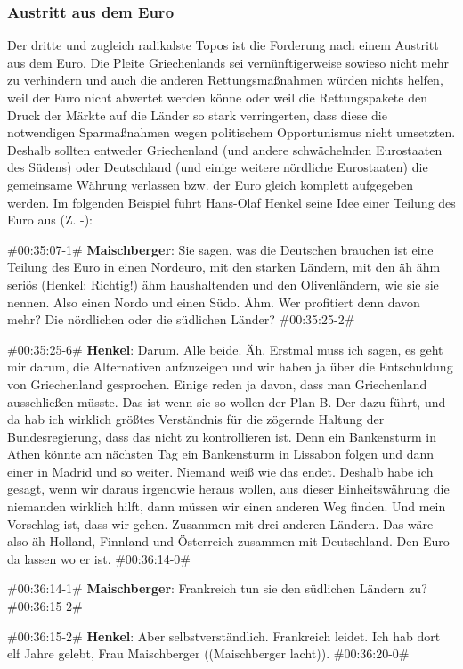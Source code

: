 \subsubsection{Austritt aus dem Euro}

Der dritte und zugleich radikalste Topos ist die Forderung nach einem Austritt aus dem Euro. Die Pleite Griechenlands sei vernünftigerweise sowieso nicht mehr zu verhindern und auch die anderen Rettungsmaßnahmen würden nichts helfen, weil der Euro nicht abwertet werden könne oder weil die Rettungspakete den Druck der Märkte auf die Länder so stark verringerten, dass diese die notwendigen Sparmaßnahmen wegen politischem Opportunismus nicht umsetzten. Deshalb sollten entweder Griechenland (und andere schwächelnden Eurostaaten des Südens) oder Deutschland (und einige weitere nördliche Eurostaaten) die gemeinsame Währung verlassen bzw. der Euro gleich komplett aufgegeben werden. Im folgenden Beispiel führt Hans-Olaf Henkel seine Idee einer Teilung des Euro aus (Z. -):

\begin{description}
	\begin{linenumbers}
		\item \#00:35:07-1\# \textbf{Maischberger}: Sie sagen, was die Deutschen brauchen ist eine Teilung des Euro in einen Nordeuro, mit den starken Ländern, mit den äh ähm seriös (Henkel: Richtig!) ähm haushaltenden und den Olivenländern, wie sie sie nennen. Also einen Nordo und einen Südo. Ähm. Wer profitiert denn davon mehr? Die nördlichen oder die südlichen Länder? \#00:35:25-2\#
		
		\item \#00:35:25-6\# \textbf{Henkel}: Darum. Alle beide. Äh. Erstmal muss ich sagen, es geht mir darum, die Alternativen aufzuzeigen und wir haben ja über die Entschuldung von Griechenland gesprochen. Einige reden ja davon, dass man Griechenland ausschließen müsste. Das ist wenn sie so wollen der Plan B. Der dazu führt, und da hab ich wirklich größtes Verständnis für die zögernde Haltung der Bundesregierung, dass das nicht zu kontrollieren ist. Denn ein Bankensturm in Athen könnte am nächsten Tag ein Bankensturm in Lissabon folgen und dann einer in Madrid und so weiter. Niemand weiß wie das endet. Deshalb habe ich gesagt, wenn wir daraus irgendwie heraus wollen, aus dieser Einheitswährung die niemanden wirklich hilft, dann müssen wir einen anderen Weg finden. Und mein Vorschlag ist, dass wir gehen. Zusammen mit drei anderen Ländern. Das wäre also äh Holland, Finnland und Österreich zusammen mit Deutschland. Den Euro da lassen wo er ist. \#00:36:14-0\# 
		
		\item \#00:36:14-1\# \textbf{Maischberger}: Frankreich tun sie den südlichen Ländern zu? \#00:36:15-2\# 
		
		\item \#00:36:15-2\# \textbf{Henkel}: Aber selbstverständlich. Frankreich leidet. Ich hab dort elf Jahre gelebt, Frau Maischberger ((Maischberger lacht)). \#00:36:20-0\#
	\end{linenumbers}
\end{description}

